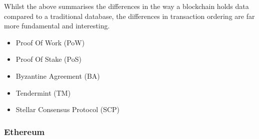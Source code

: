 Whilst the above summarises the differences in the way a blockchain holds data compared to a traditional database, the differences in transaction ordering are far more fundamental and interesting.

\begin{itemize}
  \item Proof Of Work (PoW)
  \item Proof Of Stake (PoS)
  \item Byzantine Agreement (BA)
  \item Tendermint (TM)
  \item Stellar Consensus Protocol (SCP)
\end{itemize}

\subsubsection{Ethereum}






